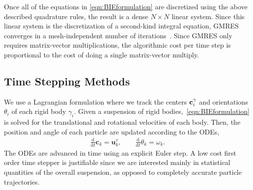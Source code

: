 \documentclass[preprint, 10pt]{elsarticle}
\begin{document}
Once all of the
equations in \eqref{eqn:BIEformulation} are discretized using the above
described
quadrature rules, the result is a dense $N \times N$ linear system.
Since this linear system is the discretization of a second-kind integral
equation, GMRES~\cite{Saad1986} converges in a mesh-independent number of
iterations~\cite{Campbell1996}.  Since GMRES only requires
matrix-vector multiplications, the algorithmic cost per time step is
proportional to the cost of doing a single matrix-vector multiply.


\subsection{Time Stepping Methods}\label{sec:temporal}

We use a Lagrangian formulation where we track the centers
${\mathbf{c}}_i^\gamma$ and orientations $\theta_i$ of each rigid body
$\gamma_i$. Given a suspension of rigid bodies,~\eqref{eqn:BIEformulation} is solved for the
translational and rotational velocities of each body. Then, the position and angle of each particle
are updated according
to the ODEs,
\begin{align*}
  \frac{\text{d}}{\text{d}t}\mathbf{c}_k = \mathbf{u}^\tau_k, \qquad
  \frac{\text{d}}{\text{d}t}\theta_k =\omega_k.
\end{align*}
The ODEs are advanced in time using an explicit Euler step. A low cost first order time stepper is
justifiable since we are interested mainly in statistical quantities of the overall suspension, as
opposed to completely accurate particle trajectories.
\end{document}
